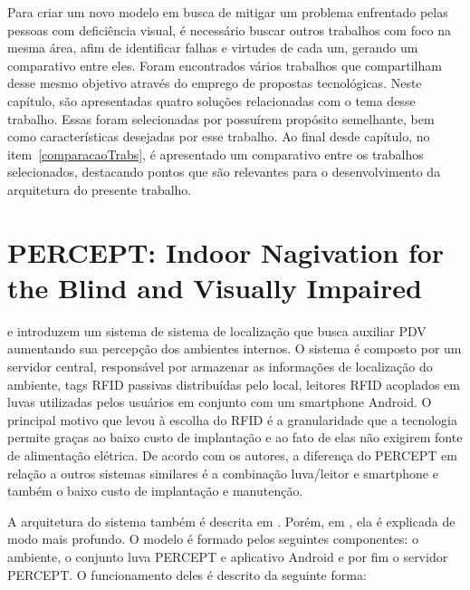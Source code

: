 \documentclass[english,brazilian]{UNISINOSmonografia}
\begin{document}
Para criar um novo modelo em busca de mitigar um problema enfrentado pelas pessoas com deficiência visual, é necessário buscar outros trabalhos com foco na mesma área, afim de identificar falhas e virtudes de cada um, gerando um comparativo entre eles. Foram encontrados vários trabalhos que compartilham desse mesmo objetivo através do emprego de propostas tecnológicas. Neste capítulo, são apresentadas quatro soluções relacionadas com o tema desse trabalho. Essas foram selecionadas por possuírem propósito semelhante, bem como características desejadas por esse trabalho. Ao final desde capítulo, no item~\ref{comparacaoTrabs}, é apresentado um comparativo entre os trabalhos selecionados, destacando pontos que são relevantes para o desenvolvimento da arquitetura do presente trabalho.

	\section{PERCEPT: Indoor Nagivation for the Blind and Visually Impaired} 
 e  introduzem um sistema de sistema de localização que busca auxiliar PDV aumentando sua percepção dos ambientes internos. O sistema é composto por um servidor central, responsável por armazenar as informações de localização do ambiente, tags RFID passivas distribuídas pelo local, leitores RFID acoplados em luvas utilizadas pelos usuários em conjunto com um smartphone Android. O principal motivo que levou à escolha do RFID é a granularidade que a tecnologia permite graças ao baixo custo de implantação e ao fato de elas não exigirem fonte de alimentação elétrica. De acordo com os autores, a diferença do PERCEPT em relação a outros sistemas similares é a combinação luva/leitor e smartphone e também o baixo custo de implantação e manutenção. 

A arquitetura do sistema também é descrita em . Porém, em , ela é explicada de modo mais profundo. O modelo é formado pelos seguintes componentes: o ambiente, o conjunto luva PERCEPT e aplicativo Android e por fim o servidor PERCEPT. O funcionamento deles é descrito da seguinte forma:
\end{document}

